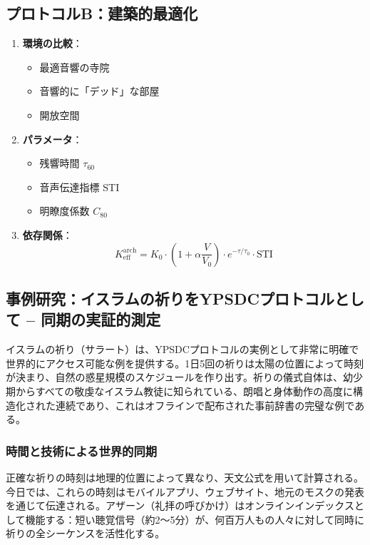 \documentclass[12pt,a4paper]{article}
\begin{document}
	\subsection{プロトコルB：建築的最適化}
	
	\begin{enumerate}
		\item \textbf{環境の比較}：
		\begin{itemize}
			\item 最適音響の寺院
			\item 音響的に「デッド」な部屋
			\item 開放空間
		\end{itemize}
		\item \textbf{パラメータ}：
		\begin{itemize}
			\item 残響時間 $\tau_{60}$
			\item 音声伝達指標 STI
			\item 明瞭度係数 $C_{80}$
		\end{itemize}
		\item \textbf{依存関係}：
		\[
		K_{\mathrm{eff}}^{\mathrm{arch}} = K_0 \cdot \left(1 + \alpha \frac{V}{V_0}\right) \cdot e^{-\tau/\tau_0} \cdot \mathrm{STI}
		\]
	\end{enumerate}
	
	\subsection{事例研究：イスラムの祈りをYPSDCプロトコルとして – 同期の実証的測定}
	\label{subsec:islamic_prayer}
	
	イスラムの祈り（サラート）は、YPSDCプロトコルの実例として非常に明確で世界的にアクセス可能な例を提供する。1日5回の祈りは太陽の位置によって時刻が決まり、自然の惑星規模のスケジュールを作り出す。祈りの儀式自体は、幼少期からすべての敬虔なイスラム教徒に知られている、朗唱と身体動作の高度に構造化された連続であり、これはオフラインで配布された事前辞書の完璧な例である。
	
	\subsubsection{時間と技術による世界的同期}
	正確な祈りの時刻は地理的位置によって異なり、天文公式を用いて計算される。今日では、これらの時刻はモバイルアプリ、ウェブサイト、地元のモスクの発表を通じて伝達される。アザーン（礼拝の呼びかけ）はオンラインインデックスとして機能する：短い聴覚信号（約2～5分）が、何百万人もの人々に対して同時に祈りの全シーケンスを活性化する。
	
\end{document}
